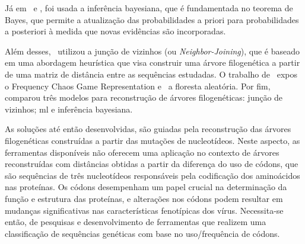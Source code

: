 Já em~\citeauthor{yin_systematic_2019} e \citeauthor{bedoya-pilozo_molecular_epidemiology_2018}, foi usada a inferência bayesiana, que é fundamentada no teorema de Bayes, que permite a atualização das probabilidades a priori para probabilidades a posteriori à medida que novas evidências são incorporadas.

Além desses,~\citeauthor{potdar_phylogenetic_2021} utilizou a junção de vizinhos (ou \textit{Neighbor-Joining}), que é baseado em uma abordagem heurística que visa construir uma árvore filogenética a partir de uma matriz de distância entre as sequências estudadas. O trabalho de~\citeauthor{lichtblau_alignment-free_2019} expos o Frequency Chaos Game Representation e~\citeauthor{kim_ngs_2022} a floresta aleatória. Por fim,~\citeauthor{dimitrov_updated_2019} comparou três modelos para reconstrução de árvores filogenéticas: junção de vizinhos; \gls{ml} e inferência bayesiana.

As soluções até então desenvolvidas, são guiadas pela reconstrução das árvores filogenéticas construídas a partir das mutações de nucleotídeos. Neste aspecto, as ferramentas disponíveis não oferecem uma aplicação no contexto de árvores reconstruídas com distâncias obtidas a partir da diferença do uso de códons, que são sequências de três nucleotídeos responsáveis pela codificação dos aminoácidos nas proteínas. Os códons desempenham um papel crucial na determinação da função e estrutura das proteínas, e alterações nos códons podem resultar em mudanças significativas nas características fenotípicas dos vírus. Necessita-se então, de pesquisas e desenvolvimento de ferramentas que realizem uma classificação de sequências genéticas com base no uso/frequência de códons.


